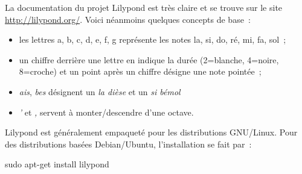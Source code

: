 La documentation du projet Lilypond est très
claire et se trouve sur le site \url{http://lilypond.org/}.
Voici néanmoins quelques concepts de base~:

\begin{itemize}
\item les lettres a, b, c, d, e, f, g représente les notes la, si, do,
  ré, mi, fa, sol~;
\item un chiffre derrière une lettre en indique la durée (2=blanche, 4=noire,
  8=croche) et un point après un chiffre désigne une note pointée~;
\item \emph{ais}, \emph{bes} désignent un \emph{la dièse} et un \emph{si bémol}
\item \emph{'} et \emph{,} servent à monter/descendre d'une octave.
\end{itemize}

Lilypond est généralement empaqueté pour les distributions
GNU/Linux. Pour des distributions basées Debian/Ubuntu, l'installation
se fait par~:

\begin{unixcom}
  sudo apt-get install lilypond
\end{unixcom}
